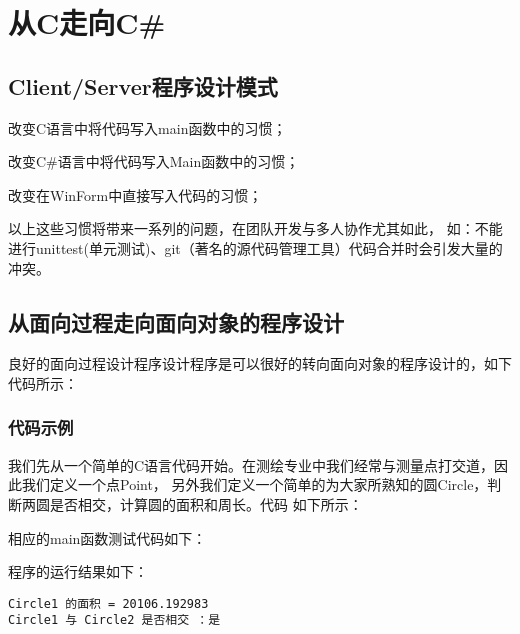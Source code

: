 ﻿%

\chapter{从C走向C\#}

\section{Client/Server程序设计模式}
改变C语言中将代码写入main函数中的习惯；

改变C\#语言中将代码写入Main函数中的习惯；

改变在WinForm中直接写入代码的习惯；

以上这些习惯将带来一系列的问题，在团队开发与多人协作尤其如此，
如：不能进行unittest(单元测试)、git（著名的源代码管理工具）代码合并时会引发大量的冲突。

\section{从面向过程走向面向对象的程序设计 }

良好的面向过程设计程序设计程序是可以很好的转向面向对象的程序设计的，如下代码所示：
 
 \subsection{代码示例}
 
 我们先从一个简单的C语言代码开始。在测绘专业中我们经常与测量点打交道，因此我们定义一个点Point，
 另外我们定义一个简单的为大家所熟知的圆Circle，判断两圆是否相交，计算圆的面积和周长。代码
 如下所示：





% 
% 
% 

相应的main函数测试代码如下：


程序的运行结果如下：
\begin{verbatim}
Circle1 的面积 = 20106.192983
Circle1 与 Circle2 是否相交 ：是
\end{verbatim}



